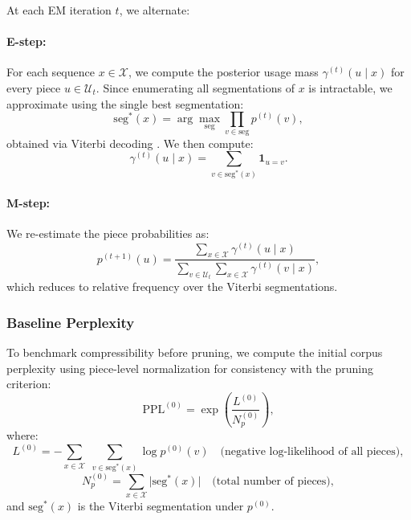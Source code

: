 At each EM iteration \(t\), we alternate:

\paragraph{E-step:}

For each sequence \(x\in\mathcal X\), we compute the posterior usage mass \(\gamma^{(t)}(u \mid x)\) for every piece \(u\in \mathcal U_t\). Since enumerating all segmentations of \(x\) is intractable, we approximate using the single best segmentation:
\begin{equation}
\mathrm{seg}^{*}(x)
= \arg\max_{\mathrm{seg}} \prod_{v\in\mathrm{seg}} p^{(t)}(v),
\label{eq:viterbi_decode}
\end{equation}
obtained via Viterbi decoding \cite{kudo2018sentencepiece}. We then compute:
\[
\gamma^{(t)}(u \mid x)
= \sum_{v \in \mathrm{seg}^{*}(x)} \mathbf{1}_{u = v}.
\]

\paragraph{M-step:}

We re-estimate the piece probabilities as:
\begin{equation}
p^{(t+1)}(u)
= \frac{
	\sum_{x \in \mathcal X} \gamma^{(t)}(u \mid x)
}{
	\sum_{v \in \mathcal U_t} \sum_{x \in \mathcal X} \gamma^{(t)}(v \mid x)
},
\label{eq:m_step_update}
\end{equation}
which reduces to relative frequency over the Viterbi segmentations.

\subsubsection{Baseline Perplexity}

To benchmark compressibility before pruning, we compute the initial corpus perplexity using piece-level normalization for consistency with the pruning criterion:
\begin{equation}
\mathrm{PPL}^{(0)}
= \exp\left(
\frac{L^{(0)}}{N_{p}^{(0)}}
\right),
\label{eq:baseline_perplexity}
\end{equation}
where:
\[
L^{(0)} = -\sum_{x\in\mathcal X}\;\sum_{v\in\mathrm{seg}^{*}(x)}\log p^{(0)}(v)
\quad\text{(negative log-likelihood of all pieces)},
\]
\[
N_{p}^{(0)} = \sum_{x\in\mathcal X} \bigl|\mathrm{seg}^{*}(x)\bigr|
\quad\text{(total number of pieces)},
\]
and \(\mathrm{seg}^{*}(x)\) is the Viterbi segmentation under \(p^{(0)}\).

